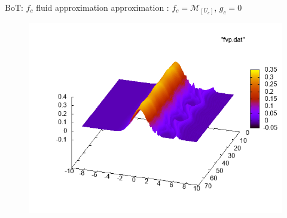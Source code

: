\documentclass{beamer}
\begin{document}
  \begin{frame}{BoT: $f_c$ fluid approximation}
  	approximation : $f_c = \mathcal{M}_{[U_c]}$, $g_c = 0$
		\begin{figure}
			\centering
			\includegraphics[height=0.8\textheight]{img/fvp_mMfluid.png}
		\end{figure}
  \end{frame}
\end{document}
